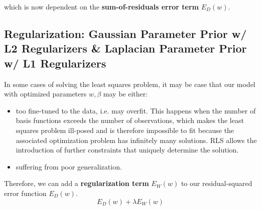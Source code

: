 \documentclass{article}
\begin{document}
    which is now dependent on the \textbf{sum-of-residuals error term} $E_D(w)$.

  \subsection{Regularization: Gaussian Parameter Prior w/ L2 Regularizers \& Laplacian Parameter Prior w/ L1 Regularizers}

    In some cases of solving the least squares problem, it may be case that our model with optimized parameters $w, \beta$ may be either:
    \begin{itemize}
      \item too fine-tuned to the data, i.e. may overfit. This happens when the number of basis functions exceeds the number of observations, which makes the least squares problem ill-posed and is therefore impossible to fit because the associated optimization problem has infinitely many solutions. RLS allows the introduction of further constraints that uniquely determine the solution.
      \item suffering from poor generalization.
    \end{itemize}

    Therefore, we can add a \textbf{regularization term} $E_W (w)$ to our residual-squared error function $E_D (w)$.
    \begin{equation}
      E_D (w) + \lambda E_W (w)
    \end{equation}
\end{document}
